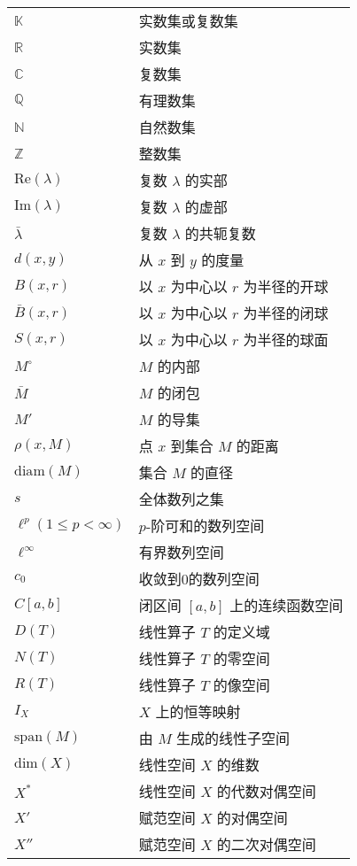 \documentclass[openany]{ctexbook}
\theoremstyle{kaiti}
\theoremstyle{normal}
\begin{document}
\begin{longtable}[l]{p{4cm}l}   
  $\mathbb{K}$ & 实数集或复数集   \\
  $\mathbb{R}$ & 实数集   \\
  $\mathbb{C}$ & 复数集   \\
  $\mathbb{Q}$  & 有理数集  \\
  $\mathbb{N}$  & 自然数集  \\
  $\mathbb{Z}$  & 整数集 \\
  $\mathrm{Re}(\lambda)$  & 复数 $\lambda$ 的实部  \\
  $\mathrm{Im}(\lambda)$  & 复数 $\lambda$ 的虚部 \\
  $\bar{\lambda}$  & 复数 $\lambda$ 的共轭复数 \\
  $d(x,y)$  & 从 $x$ 到 $y$ 的度量 \\
  $B(x,r)$  & 以 $x$ 为中心以 $r$ 为半径的开球 \\
  $\bar{B}(x,r)$  & 以 $x$ 为中心以 $r$ 为半径的闭球 \\
  $S(x,r)$  & 以 $x$ 为中心以 $r$ 为半径的球面 \\
  $M^\circ$  & $M$ 的内部 \\
  $\bar{M}$  & $M$ 的闭包 \\
  $M'$  & $M$ 的导集 \\
  $\rho(x,M)$  & 点 $x$ 到集合 $M$ 的距离 \\
  $\mathrm{diam}(M)$  & 集合 $M$ 的直径 \\
  $s$  & 全体数列之集 \\
  $\ell^p(1\leqslant p<\infty)$  & $p$-阶可和的数列空间 \\
  $\ell^\infty$  & 有界数列空间 \\
  $c_0$  & 收敛到0的数列空间 \\
  $C[a,b]$  & 闭区间 $[a,b]$ 上的连续函数空间 \\
  $D(T)$  & 线性算子 $T$ 的定义域 \\
  $N(T)$  & 线性算子 $T$ 的零空间 \\
  $R(T)$  & 线性算子 $T$ 的像空间 \\
  $I_X$  & $X$ 上的恒等映射  \\
  $\mathrm{span}(M)$  & 由 $M$ 生成的线性子空间 \\
  $\mathrm{dim}(X)$  & 线性空间 $X$ 的维数 \\
  $X^*$  & 线性空间 $X$ 的代数对偶空间  \\
  $X'$  & 赋范空间 $X$ 的对偶空间 \\
  $X''$  & 赋范空间 $X$ 的二次对偶空间 \\

\end{longtable}
\end{document}
